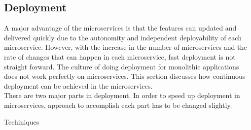 \subsection{Deployment}\label{section:challanges_of_microservices_architecture/deployment}
A major advantage of the microservices is that the features can updated and delivered quickly due to the autonomity and independent deployability of each microservice. However, with the increase in the number of microservices and the rate of changes that can happen in each microservice, fast deployment is not straight forward. The culture of doing deployment for monolithic applications does not work perfectly on microservices. This section discusses how continuous deployment can be achieved in the microservices.
\\
There are two major parts in deployment. In order to speed up deployment in microservices, approach to accomplish each part has to be changed slightly.
\begin{shaded}Techiniques\end{shaded}
